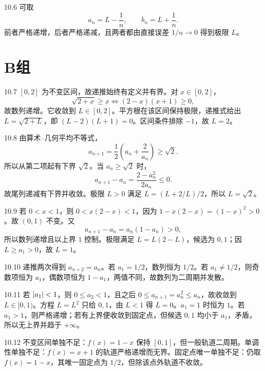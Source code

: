 \begin{solution}{10.6}
可取
\[
 a_n=L-\frac1n,\qquad b_n=L+\frac1n.
\]
前者严格递增，后者严格递减，且两者都由直接误差 \(1/n\to0\) 得到极限 \(L\)。
\end{solution}

\section*{B组}

\begin{solution}{10.7}
\([0,2]\) 为不变区间，故递推始终有定义并有界。对 \(x\in[0,2]\)，
\[
 \sqrt{2+x}\ge x\Longleftrightarrow(2-x)(x+1)\ge0,
\]
故数列递增。它收敛到 \(L\in[0,2]\)。平方根在该区间保持极限，递推式给出
\(L=\sqrt{2+L}\)，即 \((L-2)(L+1)=0\)。区间条件排除 \(-1\)，故 \(L=2\)。
\end{solution}

\begin{solution}{10.8}
由算术--几何平均不等式，
\[
 a_{n+1}=\frac12\left(a_n+\frac2{a_n}\right)\ge\sqrt2.
\]
所以从第二项起有下界 \(\sqrt2\)。当 \(a_n\ge\sqrt2\) 时，
\[
 a_{n+1}-a_n=\frac{2-a_n^2}{2a_n}\le0.
\]
故尾列递减有下界并收敛。极限 \(L>0\) 满足
\(L=(L+2/L)/2\)，所以 \(L=\sqrt2\)。
\end{solution}

\begin{solution}{10.9}
若 \(0<x<1\)，则 \(0<x(2-x)<1\)，因为
\(1-x(2-x)=(1-x)^2>0\)。故 \((0,1)\) 不变。又
\[
 a_{n+1}-a_n=a_n(1-a_n)>0,
\]
所以数列递增且以上界 \(1\) 控制。极限满足
\(L=L(2-L)\)，候选为 \(0,1\)；因 \(L\ge a_1>0\)，故 \(L=1\)。
\end{solution}

\begin{solution}{10.10}
递推两次得到 \(a_{n+2}=a_n\)。若 \(a_1=1/2\)，数列恒为 \(1/2\)。若 \(a_1\ne1/2\)，则奇数项恒为 \(a_1\)，偶数项恒为 \(1-a_1\)，两值不同，故数列为二周期并发散。
\end{solution}

\begin{solution}{10.11}
若 \(\left|a_1\right|<1\)，则 \(0\le a_2<1\)，且之后
\(0\le a_{n+1}=a_n^2\le a_n\)，故收敛到 \(L\in[0,1)\)。方程 \(L=L^2\) 只给 \(0,1\)，由 \(L<1\) 得 \(L=0\)。\(a_1=1\) 时恒为 \(1\)。若 \(a_1>1\)，则严格递增；若有上界便收敛到固定点，但候选 \(0,1\) 均小于 \(a_1\)，矛盾，所以无上界并趋于 \(+\infty\)。
\end{solution}

\begin{solution}{10.12}
不变区间单独不足：\(f(x)=1-x\) 保持 \([0,1]\)，但一般轨道二周期。单调性单独不足：\(f(x)=x+1\) 的轨道严格递增而无界。固定点唯一单独不足：仍取 \(f(x)=1-x\)，其唯一固定点为 \(1/2\)，但除该点外轨道不收敛。
\end{solution}

